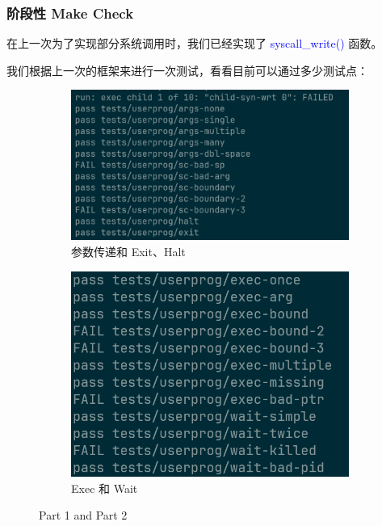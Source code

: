 \documentclass[14pt,a4paper,UTF8,twoside]{article}
\renewcommand{\texttt}[1]{\textcolor{blue}{\ttfamily #1}}
\begin{document}
\subsubsection{阶段性 Make Check}

在上一次为了实现部分系统调用时，我们已经实现了 \texttt{syscall\_write()} 函数。

我们根据上一次的框架来进行一次测试，看看目前可以通过多少测试点：

\begin{center}
\begin{figure}[H]
    \centering
    \begin{subfigure}[b]{0.35\textwidth}
        \centering
        \includegraphics[width=\textwidth]{img6/passpart1.png}
        \caption{参数传递和 Exit、Halt}
        \label{fig:part1}
    \end{subfigure}
    \hspace{1cm}
    \begin{subfigure}[b]{0.35\textwidth}
        \centering
        \includegraphics[width=\textwidth]{img6/passpart2.png}
        \caption{Exec 和 Wait}
        \label{fig:part2}
    \end{subfigure}
    \caption{Part 1 and Part 2}
    \label{fig:test}
\end{figure}
\end{center}
\end{document}

